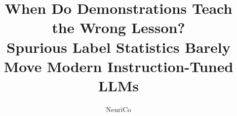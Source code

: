 \documentclass{article}
\title{When Do Demonstrations Teach the Wrong Lesson?\\Spurious Label Statistics Barely Move Modern Instruction-Tuned LLMs}
\author{NeuriCo}
\begin{document}
\maketitle

\begin{abstract}

\end{abstract}










\appendix

\end{document}
